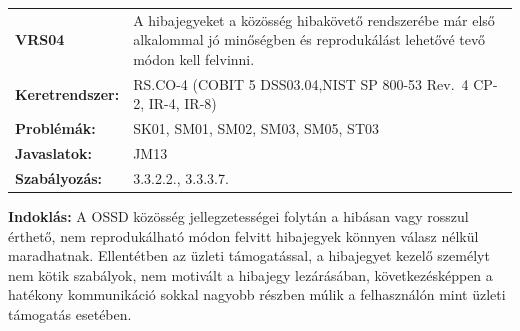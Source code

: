\documentclass[12pt,magyar,a4paper,oneside]{scrreprt}
\begin{document}
\begin{longtable}[]{@{}ll@{}}
\toprule
\endhead
\begin{minipage}[t]{0.16\columnwidth}\raggedright
\textbf{VRS04}\strut
\end{minipage} & \begin{minipage}[t]{0.79\columnwidth}\raggedright
A hibajegyeket a közösség hibakövető rendszerébe már első alkalommal jó
minőségben és reprodukálást lehetővé tevő módon kell felvinni.\strut
\end{minipage}\tabularnewline
\begin{minipage}[t]{0.16\columnwidth}\raggedright
\textbf{Keretrendszer:}\strut
\end{minipage} & \begin{minipage}[t]{0.79\columnwidth}\raggedright
RS.CO-4 (COBIT 5 DSS03.04,NIST SP 800-53 Rev.~4 CP-2, IR-4, IR-8)\strut
\end{minipage}\tabularnewline
\begin{minipage}[t]{0.16\columnwidth}\raggedright
\textbf{Problémák:}\strut
\end{minipage} & \begin{minipage}[t]{0.79\columnwidth}\raggedright
SK01, SM01, SM02, SM03, SM05, ST03\strut
\end{minipage}\tabularnewline
\begin{minipage}[t]{0.16\columnwidth}\raggedright
\textbf{Javaslatok:}\strut
\end{minipage} & \begin{minipage}[t]{0.79\columnwidth}\raggedright
JM13\strut
\end{minipage}\tabularnewline
\begin{minipage}[t]{0.16\columnwidth}\raggedright
\textbf{Szabályozás:}\strut
\end{minipage} & \begin{minipage}[t]{0.79\columnwidth}\raggedright
3.3.2.2., 3.3.3.7.\strut
\end{minipage}\tabularnewline
\bottomrule
\end{longtable}

\textbf{Indoklás: } A OSSD közösség jellegzetességei folytán a hibásan
vagy rosszul érthető, nem reprodukálható módon felvitt hibajegyek
könnyen válasz nélkül maradhatnak. Ellentétben az üzleti támogatással, a
hibajegyet kezelő személyt nem kötik szabályok, nem motivált a hibajegy
lezárásában, következésképpen a hatékony kommunikáció sokkal nagyobb
részben múlik a felhasználón mint üzleti támogatás esetében.
\end{document}
